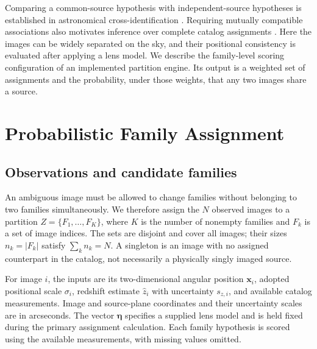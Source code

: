 \documentclass[twocolumn,twocolappendix,linenumbers]{aastex701}
\begin{document}
Comparing a common-source hypothesis with independent-source hypotheses is established in astronomical cross-identification \citep{Budavari2008}.
Requiring mutually compatible associations also motivates inference over complete catalog assignments \citep{Budavari2016}.
Here the images can be widely separated on the sky, and their positional consistency is evaluated after applying a lens model.
We describe the family-level scoring configuration of an implemented partition engine.
Its output is a weighted set of assignments and the probability, under those weights, that any two images share a source.

\section{Probabilistic Family Assignment}
\label{sec:method}
\subsection{Observations and candidate families}
\label{sec:data}
An ambiguous image must be allowed to change families without belonging to two families simultaneously.
We therefore assign the $N$ observed images to a partition $Z=\{F_1,\ldots,F_K\}$, where $K$ is the number of nonempty families and $F_k$ is a set of image indices.
The sets are disjoint and cover all images; their sizes $n_k=|F_k|$ satisfy $\sum_k n_k=N$.
A singleton is an image with no assigned counterpart in the catalog, not necessarily a physically singly imaged source.

For image $i$, the inputs are its two-dimensional angular position $\boldsymbol{x}_i$, adopted positional scale $\sigma_i$, redshift estimate $\hat z_i$ with uncertainty $s_{z,i}$, and available catalog measurements.
Image and source-plane coordinates and their uncertainty scales are in arcseconds.
The vector $\boldsymbol{\eta}$ specifies a supplied lens model and is held fixed during the primary assignment calculation.
Each family hypothesis is scored using the available measurements, with missing values omitted.
\end{document}
